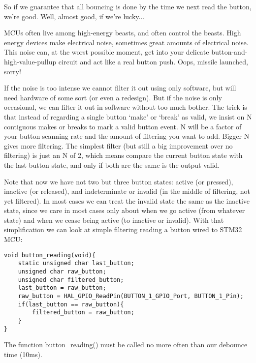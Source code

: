 So if we guarantee that all bouncing is done by the time we next read the button, we're good.  Well, almost good, if we're lucky...

MCUs often live among high-energy beasts, and often control the beasts.  High energy devices make electrical noise, sometimes great amounts of electrical noise.  This noise can, at the worst possible moment, get into your delicate button-and-high-value-pullup circuit and act like a real button push.  Oops, missile launched, sorry!

If the noise is too intense we cannot filter it out using only software, but will need hardware of some sort (or even a redesign).  But if the noise is only occasional, we can filter it out in software without too much bother.  The trick is that instead of regarding a single button `make' or `break' as valid, we insist on N contiguous makes or breaks to mark a valid button event.  N will be a factor of your button scanning rate and the amount of filtering you want to add.  Bigger N gives more filtering.  The simplest filter (but still a big improvement over no filtering) is just an N of 2, which means compare the current button state with the last button state, and only if both are the same is the output valid.

Note that now we have not two but three button states: active (or pressed), inactive (or released), and indeterminate or invalid (in the middle of filtering, not yet filtered).  In most cases we can treat the invalid state the same as the inactive state, since we care in most cases only about when we go active (from whatever state) and when we cease being active (to inactive or invalid).  With that simplification we can look at simple  filtering reading a button wired to STM32 MCU:
\begin{lstlisting}[caption=Read port pin and deboucing]
void button_reading(void){
    static unsigned char last_button;
    unsigned char raw_button;
    unsigned char filtered_button;
    last_button = raw_button;
    raw_button = HAL_GPIO_ReadPin(BUTTON_1_GPIO_Port, BUTTON_1_Pin);
    if(last_button == raw_button){
        filtered_button = raw_button;
    }
}
\end{lstlisting}

The function button\_reading() must be called no more often than our debounce time (10ms).

